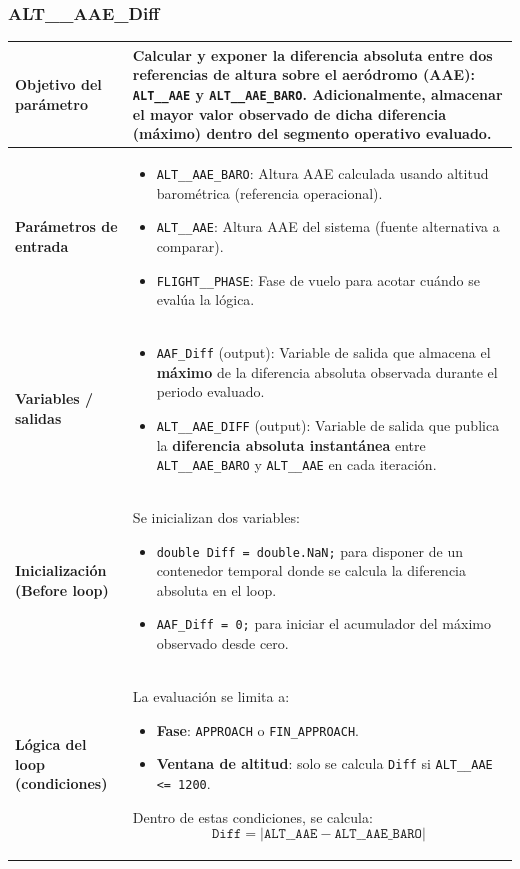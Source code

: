 \documentclass[11pt,a4paper]{article}
\begin{document}
	\subsubsection{ALT\_\_AAE\_Diff}
	
	\begin{longtable}{p{5cm} p{9.5cm}}
		\hline
		\textbf{Objetivo del parámetro} &
		Calcular y exponer la diferencia absoluta entre dos referencias de altura sobre el aeródromo (AAE): \texttt{ALT\_\_AAE} y \texttt{ALT\_\_AAE\_BARO}. Adicionalmente, almacenar el mayor valor observado de dicha diferencia (máximo) dentro del segmento operativo evaluado. \\
		\hline
		\textbf{Parámetros de entrada} &
		\begin{itemize}
			\item \texttt{ALT\_\_AAE\_BARO}: Altura AAE calculada usando altitud barométrica (referencia operacional).
			\item \texttt{ALT\_\_AAE}: Altura AAE del sistema (fuente alternativa a comparar).
			\item \texttt{FLIGHT\_\_PHASE}: Fase de vuelo para acotar cuándo se evalúa la lógica.
		\end{itemize}
		\\
		
		\textbf{Variables / salidas} &
		\begin{itemize}
			\item \texttt{AAF\_Diff} (output): Variable de salida que almacena el \textbf{máximo} de la diferencia absoluta observada durante el periodo evaluado.
			\item \texttt{ALT\_\_AAE\_DIFF} (output): Variable de salida que publica la \textbf{diferencia absoluta instantánea} entre \texttt{ALT\_\_AAE\_BARO} y \texttt{ALT\_\_AAE} en cada iteración.
		\end{itemize}
		\\ \hline
		
		\textbf{Inicialización (Before loop)} &
		Se inicializan dos variables:
		\begin{itemize}
			\item \texttt{double Diff = double.NaN;} para disponer de un contenedor temporal donde se calcula la diferencia absoluta en el loop.
			\item \texttt{AAF\_Diff = 0;} para iniciar el acumulador del máximo observado desde cero.
		\end{itemize}
		\\ \hline
		
		\textbf{Lógica del loop (condiciones)} &
		La evaluación se limita a:
		\begin{itemize}
			\item \textbf{Fase}: \texttt{APPROACH} o \texttt{FIN\_APPROACH}.
			\item \textbf{Ventana de altitud}: solo se calcula \texttt{Diff} si \texttt{ALT\_\_AAE <= 1200}.
		\end{itemize}
		Dentro de estas condiciones, se calcula:
		\[
		\texttt{Diff} = \left| \texttt{ALT\_\_AAE} - \texttt{ALT\_\_AAE\_BARO} \right|
		\]
		\\ \hline
		

\end{longtable}
\end{document}
